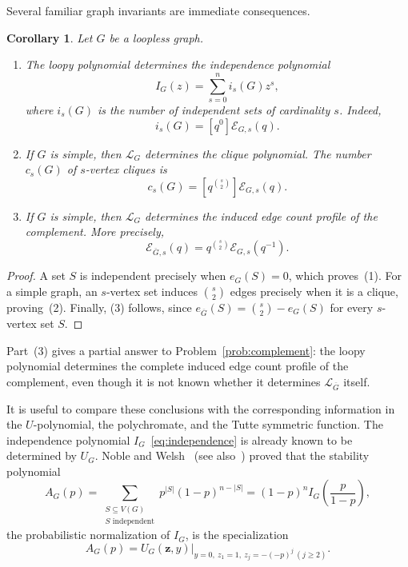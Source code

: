 \documentclass[11pt]{article}
\theoremstyle{plain}
\newtheorem{corollary}[theorem]{Corollary}
\theoremstyle{definition}
\renewcommand{\mathcal}{\mathscr}
\newcommand{\LL}{\mathcal{L}}    %
\newcommand{\cE}{\mathcal{E}}    %
\newcommand{\bz}{\mathbf{z}}
\numberwithin{equation}{section}
\begin{document}
Several familiar graph invariants are immediate consequences.

\begin{corollary}\label{cor:independence-clique}
Let $G$ be a loopless graph.
\begin{enumerate}[(1)]
\item The loopy polynomial determines the independence polynomial
  \begin{equation}
    \label{eq:independence}
   I_G(z)=\sum_{s=0}^{n} i_s(G)z^s,
 \end{equation}
where $i_s(G)$ is the number of independent sets of cardinality $s$.  Indeed,
\begin{equation}\label{eq:independence-from-edge-profile}
   i_s(G)=[q^0]\cE_{G,s}(q).
\end{equation}

\item If $G$ is simple, then $\LL_G$ determines the clique polynomial.  The
number $c_s(G)$ of $s$-vertex cliques is
\begin{equation}\label{eq:cliques-from-edge-profile}
   c_s(G)
   =[q^{\binom{s}{2}}]\cE_{G,s}(q).
\end{equation}

\item If $G$ is simple, then $\LL_G$ determines the induced edge count
profile of the complement.  More precisely,
\begin{equation}\label{eq:complement-edge-profile}
   \cE_{\overline G,s}(q)
   =
   q^{\binom{s}{2}}\cE_{G,s}(q^{-1}).
\end{equation}
\end{enumerate}
\end{corollary}

\begin{proof}
A set $S$ is independent precisely when $e_G(S)=0$, which proves~(1).
For a simple graph, an $s$-vertex set induces $\binom{s}{2}$ edges precisely
when it is a clique, proving~(2).  Finally, (3) follows, since
$   e_{\overline G}(S)=\binom{s}{2}-e_G(S) $
for every $s$-vertex set $S$.
\end{proof}

Part~(3) gives a partial answer to Problem~\ref{prob:complement}: the loopy polynomial
determines the complete induced edge count profile of the
complement, even though it is not known whether it determines $\LL_{\overline G}$ itself.

It is useful to compare these conclusions with the corresponding information
in the $U$-polynomial, the polychromate, and the Tutte symmetric
function.  The independence polynomial $I_G$~\eqref{eq:independence} is already known to be determined by
$U_G$.  Noble and Welsh~\cite[Theorem~5.2]{NW} (see also~\cite[Theorem~26.37]{Nob}) proved that the stability polynomial
\[
  A_G(p)  =
  \sum_{\substack{S\subseteq V(G)\\S\text{ independent}}}
  p^{|S|}(1-p)^{n-|S|} =(1-p)^n I_G\!\left(\frac{p}{1-p}\right),
\]
the probabilistic normalization of $I_G$, is the specialization
\[
  A_G(p)  =
  \left.
    U_G(\bz,y)\right|_{y=0,\ z_1=1,\ z_j=-(-p)^j\ (j\ge 2)}.
  \]
\end{document}
